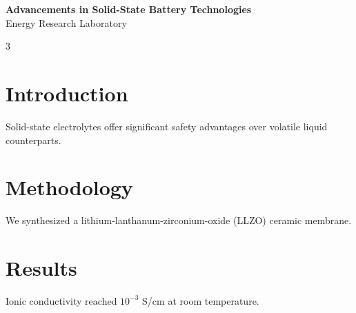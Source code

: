 \documentclass{article}
\begin{document}
\begin{center}
\Huge \textbf{Advancements in Solid-State Battery Technologies} \\
\Large Energy Research Laboratory
\end{center}
\vspace{2cm}
\Large
\begin{multicols}{3}
\section*{Introduction}
Solid-state electrolytes offer significant safety advantages over volatile liquid counterparts.
\section*{Methodology}
We synthesized a lithium-lanthanum-zirconium-oxide (LLZO) ceramic membrane.
\section*{Results}
Ionic conductivity reached $10^{-3}$ S/cm at room temperature.
\end{multicols}
\end{document}

